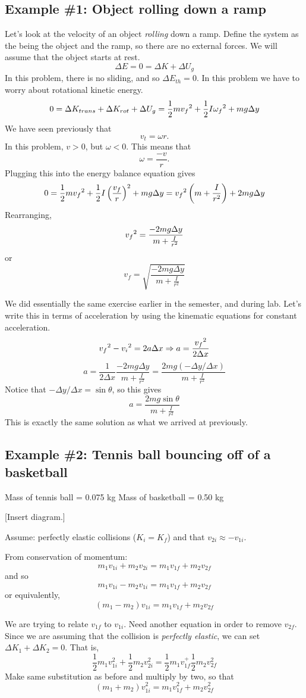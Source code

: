 \subsection{Example \#1: Object rolling down a ramp}
Let's look at the velocity of an object {\it rolling} down a ramp. Define the system as the being the object and the ramp, so there are no external forces. We will assume that the object starts at rest.
$$\Delta{E}=0=\Delta{K}+\Delta{U_g}$$
In this problem, there is no sliding, and so $\Delta{E_{th}}=0$. In this problem we have to worry about rotational kinetic energy.
$$0=\Delta{K_{trans}}+\Delta{K_{rot}}+\Delta{U_g}=\frac{1}{2}mv_f\displaystyle^2+\frac{1}{2}I\omega_f\displaystyle^2+mg\Delta y$$
We have seen previously that 
$$v_t=\omega r.$$
In this problem, $v>0$, but $\omega<0$. This means that 
$$\omega=\frac{-v}{r}.$$
Plugging this into the energy balance equation gives
$$0=\frac{1}{2}mv_f\displaystyle^2+\frac{1}{2}I\left(\frac{v_f}{r}\right)^2+mg\Delta y=v_f\displaystyle^2\left(m+\frac{I}{r^2}\right)+2mg\Delta{y}$$
Rearranging,
$$v_f\displaystyle^2=\frac{-2mg\Delta{y}}{m+\frac{I}{r^2}}$$
or
$$\boxed{v_f=\sqrt{\frac{-2mg\Delta{y}}{m+\frac{I}{r^2}}}}$$

We did essentially the same exercise earlier in the semester, and during lab. Let's write this in terms of acceleration by using the kinematic equations for constant acceleration.
$$v_f\displaystyle^2-v_i\displaystyle^2=2a\Delta{x}\Rightarrow a=\frac{v_f\displaystyle^2}{2\Delta{x}}$$
$$a=\frac{1}{2\Delta{x}}\frac{-2mg\Delta{y}}{m+\frac{I}{r^2}}=\frac{2mg(-\Delta{y}/\Delta{x})}{m+\frac{I}{r^2}}$$
Notice that $-\Delta{y}/\Delta{x}=\sin\theta$, so this gives
$$\boxed{a=\frac{2mg\sin\theta}{m+\frac{I}{r^2}}}$$
This is exactly the same solution as what we arrived at previously.

\subsection{Example \#2: Tennis ball bouncing off of a basketball}
Mass of tennis ball = 0.075 kg
Mass of basketball = 0.50 kg

[Insert diagram.]
\vspace{5cm}

Assume: perfectly elastic collisions ($K_i=K_f$) and that $v_{2i}\approx -v_{1i}$.

From conservation of momentum:
$$m_1v_{1i}+m_2v_{2i}=m_1v_{1f}+m_2v_{2f}$$
and so
$$m_1v_{1i}-m_2v_{1i}=m_1v_{1f}+m_2v_{2f}$$
or equivalently,
$$\boxed{(m_1-m_2)v_{1i}=m_1v_{1f}+m_2v_{2f}}$$

We are trying to relate $v_{1f}$ to $v_{1i}$. Need another equation in order to remove $v_{2f}$. Since we are assuming that the collision is \textit{perfectly elastic}, we can set $\Delta K_1+\Delta K_2 = 0$.
That is,
$$\frac{1}{2}m_1v_{1i}^2+\frac{1}{2}m_2v_{2i}^2=\frac{1}{2}m_1v_{1f}^+\frac{1}{2}m_2v_{2f}^2$$
Make same substitution as before and multiply by two, so that
$$\boxed{(m_1+m_2)v_{1i}^2 = m_1v_{1f}^2+m_2v_{2f}^2}$$

